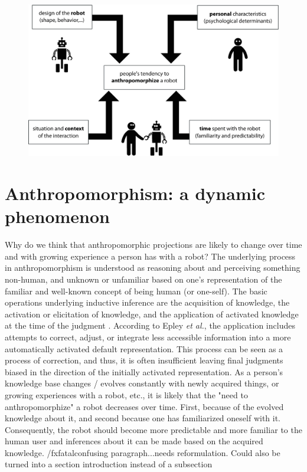 \documentclass{frontiersSCNS} %
\begin{document}
\begin{figure}
    \centering
    \includegraphics[width=0.6\columnwidth]{factors}
    \caption{}
    \label{factors}
\end{figure}


%
%
%
%
%
%
%
%
%

\section{Anthropomorphism: a dynamic phenomenon}
\label{sec:our-ideas}

Why do we think that anthropomorphic projections are likely to change over time
and with growing experience a person has with a robot? The underlying process in
anthropomorphism is understood as reasoning about and perceiving something
non-human, and unknown or unfamiliar based on one's representation of the
familiar and well-known concept of being human (or one-self). The basic
operations underlying inductive inference are the acquisition of knowledge, the
activation or elicitation of knowledge, and the application of activated
knowledge at the time of the judgment \cite{epley_when_2008}. According to Epley
\textit{et al.}, the application includes attempts to correct, adjust, or
integrate less accessible information into a more automatically activated
default representation. This process can be seen as a process of correction, and
thus, it is often insufficient leaving final judgments biased in the direction
of the initially activated representation. As a person's knowledge base changes
/ evolves constantly with newly acquired things, or growing experiences with a
robot, etc., it is likely that the "need to anthropomorphize" a robot decreases
over time. First, because of the evolved knowledge about it, and second because
one has familiarized oneself with it. Consequently, the robot should become more
predictable and more familiar to the human user and inferences about it can be
made based on the acquired knowledge.  /fxfatal{confusing paragraph...needs
reformulation. Could also be turned into a section introduction instead of a
subsection}
\end{document}
